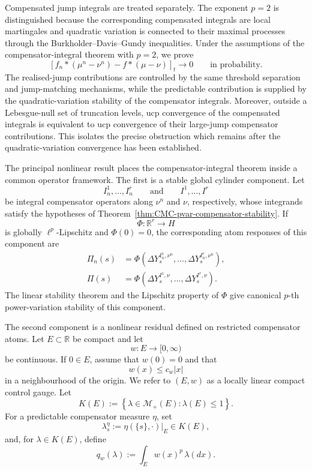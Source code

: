 \documentclass[a4paper,10pt]{article}
\begin{document}
Compensated jump integrals are treated separately. The exponent
\(p=2\) is distinguished because the corresponding compensated
integrals are local martingales and quadratic variation is connected
to their maximal processes through the Burkholder--Davis--Gundy
inequalities. Under the assumptions of the compensator-integral
theorem with \(p=2\), we prove
\[
\left[
f_n*(\mu^n-\nu^n)
-
f*(\mu-\nu)
\right]_t
\longrightarrow0
\qquad\text{in probability}.
\]
The realised-jump contributions are controlled by the same threshold
separation and jump-matching mechanisms, while the predictable
contribution is supplied by the quadratic-variation stability of the
compensator integrals. Moreover, outside a Lebesgue-null set of
truncation levels, ucp convergence of the compensated integrals is
equivalent to ucp convergence of their large-jump compensator
contributions. This isolates the precise obstruction which remains
after the quadratic-variation convergence has been established.

The principal nonlinear result places the compensator-integral theorem
inside a common operator framework. The first is a stable global
cylinder component. Let
\[
        I_n^1,\ldots,I_n^r
        \qquad\text{and}\qquad
        I^1,\ldots,I^r
\]
be integral compensator operators along \(\nu^n\) and \(\nu\),
respectively, whose integrands satisfy the hypotheses of
Theorem~\ref{thm:CMC-pvar-compensator-stability}. If
\[
        \Phi:\mathbb R^r\longrightarrow H
\]
is globally \(\ell^p\)-Lipschitz and \(\Phi(0)=0\), the corresponding
atom responses of this component are
\[
\begin{aligned}
\Pi_n(s)
&=
\Phi\left(
        \Delta Y_s^{I_n^1,\nu^n},
        \ldots,
        \Delta Y_s^{I_n^r,\nu^n}
\right),
\\
\Pi(s)
&=
\Phi\left(
        \Delta Y_s^{I^1,\nu},
        \ldots,
        \Delta Y_s^{I^r,\nu}
\right).
\end{aligned}
\]
The linear stability theorem and the Lipschitz property of \(\Phi\)
give canonical \(p\)-th power-variation stability of this component.

The second component is a nonlinear residual defined on restricted
compensator atoms. Let \(E\subset\mathbb R\) be compact and let
\[
        w:E\longrightarrow[0,\infty)
\]
be continuous. If \(0\in E\), assume that \(w(0)=0\) and that
\[
        w(x)\le c_w|x|
\]
in a neighbourhood of the origin. We refer to \((E,w)\) as a locally
linear compact control gauge. Let
\[
K(E)
:=
\left\{
        \lambda\in\mathcal M_+(E):
        \lambda(E)\le1
\right\}.
\]
For a predictable compensator measure \(\eta\), set
\[
        \lambda_s^\eta
        :=
        \eta(\{s\},\cdot)|_E
        \in K(E),
\]
and, for \(\lambda\in K(E)\), define
\[
        q_w(\lambda)
        :=
        \int_Ew(x)^p\,\lambda(dx).
\]
\end{document}
